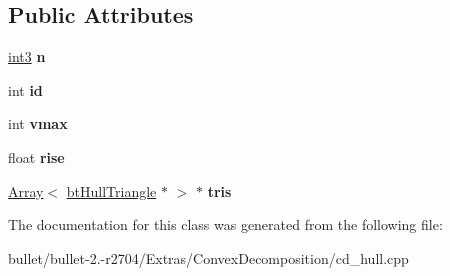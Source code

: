 \subsection*{Public Attributes}
\begin{DoxyCompactItemize}
\item 
\hypertarget{class_convex_decomposition_1_1bt_hull_triangle_a9da60ee7b4d51a804a32150f302df60f}{\hyperlink{class_convex_decomposition_1_1int3}{int3} {\bfseries n}}\label{class_convex_decomposition_1_1bt_hull_triangle_a9da60ee7b4d51a804a32150f302df60f}

\item 
\hypertarget{class_convex_decomposition_1_1bt_hull_triangle_a535f469cc845b9156c6d42f4dd029789}{int {\bfseries id}}\label{class_convex_decomposition_1_1bt_hull_triangle_a535f469cc845b9156c6d42f4dd029789}

\item 
\hypertarget{class_convex_decomposition_1_1bt_hull_triangle_aacfbbc82068264699f4382f90b22ddb2}{int {\bfseries vmax}}\label{class_convex_decomposition_1_1bt_hull_triangle_aacfbbc82068264699f4382f90b22ddb2}

\item 
\hypertarget{class_convex_decomposition_1_1bt_hull_triangle_a21a835d3106a8c7f20b60df175947909}{float {\bfseries rise}}\label{class_convex_decomposition_1_1bt_hull_triangle_a21a835d3106a8c7f20b60df175947909}

\item 
\hypertarget{class_convex_decomposition_1_1bt_hull_triangle_a5a6bc721b902f45c733653788a13394b}{\hyperlink{class_convex_decomposition_1_1_array}{Array}$<$ \hyperlink{class_convex_decomposition_1_1bt_hull_triangle}{bt\+Hull\+Triangle} $\ast$ $>$ $\ast$ {\bfseries tris}}\label{class_convex_decomposition_1_1bt_hull_triangle_a5a6bc721b902f45c733653788a13394b}

\end{DoxyCompactItemize}


The documentation for this class was generated from the following file\+:\begin{DoxyCompactItemize}
\item 
bullet/bullet-\/2.-\/r2704/\+Extras/\+Convex\+Decomposition/cd\+\_\+hull.\+cpp\end{DoxyCompactItemize}
